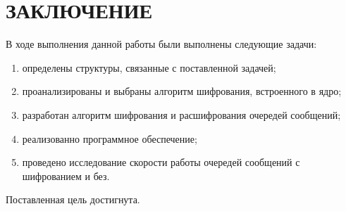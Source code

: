 \section*{\large ЗАКЛЮЧЕНИЕ}

В ходе выполнения данной работы были выполнены следующие задачи:
\begin{enumerate}
    \item определены структуры, связанные с поставленной задачей;
    \item проанализированы и выбраны алгоритм шифрования, встроенного в ядро;
    \item разработан алгоритм шифрования и расшифрования очередей сообщений;
    \item реализованно программное обеспечение;
    \item проведено исследование скорости работы очередей сообщений с шифрованием и без.
\end{enumerate}


Поставленная цель достигнута.